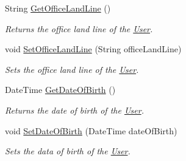 \begin{DoxyCompactItemize}
String \hyperlink{classcom_1_1shephertz_1_1app42_1_1paas_1_1sdk_1_1csharp_1_1user_1_1_user_1_1_profile_aac7b15334c01fa85352c90e7665dd666}{Get\+Office\+Land\+Line} ()
\begin{DoxyCompactList}\small\item\em Returns the office land line of the \hyperlink{classcom_1_1shephertz_1_1app42_1_1paas_1_1sdk_1_1csharp_1_1user_1_1_user}{User}. \end{DoxyCompactList}\item 
void \hyperlink{classcom_1_1shephertz_1_1app42_1_1paas_1_1sdk_1_1csharp_1_1user_1_1_user_1_1_profile_a6233914a6855f63a4f56fad43f6d4ad4}{Set\+Office\+Land\+Line} (String office\+Land\+Line)
\begin{DoxyCompactList}\small\item\em Sets the office land line of the \hyperlink{classcom_1_1shephertz_1_1app42_1_1paas_1_1sdk_1_1csharp_1_1user_1_1_user}{User}. \end{DoxyCompactList}\item 
Date\+Time \hyperlink{classcom_1_1shephertz_1_1app42_1_1paas_1_1sdk_1_1csharp_1_1user_1_1_user_1_1_profile_ad659110af237afdad8bfff98d7492648}{Get\+Date\+Of\+Birth} ()
\begin{DoxyCompactList}\small\item\em Returns the date of birth of the \hyperlink{classcom_1_1shephertz_1_1app42_1_1paas_1_1sdk_1_1csharp_1_1user_1_1_user}{User}. \end{DoxyCompactList}\item 
void \hyperlink{classcom_1_1shephertz_1_1app42_1_1paas_1_1sdk_1_1csharp_1_1user_1_1_user_1_1_profile_a3395a27dcd9a098b296424f067e00d8c}{Set\+Date\+Of\+Birth} (Date\+Time date\+Of\+Birth)
\begin{DoxyCompactList}\small\item\em Sets the data of birth of the \hyperlink{classcom_1_1shephertz_1_1app42_1_1paas_1_1sdk_1_1csharp_1_1user_1_1_user}{User}. \end{DoxyCompactList}\end{DoxyCompactItemize}
